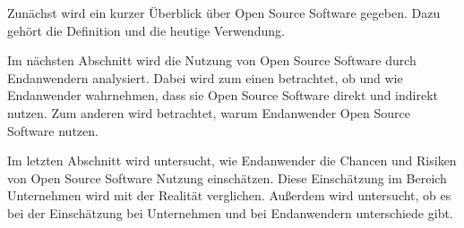 \documentclass[a4paper]{article}
\begin{document}
	   Zunächst wird ein kurzer Überblick über Open Source Software gegeben. Dazu gehört die Definition und die heutige Verwendung.
	   
	   
	   Im nächsten Abschnitt wird die Nutzung von Open Source Software durch Endanwendern analysiert. Dabei wird zum einen betrachtet, ob und wie Endanwender wahrnehmen, dass sie Open Source Software direkt und indirekt nutzen.
	   Zum anderen wird betrachtet, warum Endanwender Open Source Software nutzen.
	   
	   Im letzten Abschnitt wird untersucht, wie Endanwender die Chancen und Risiken von Open Source Software Nutzung einschätzen.
	   Diese Einschätzung im Bereich Unternehmen wird mit der Realität verglichen.
	   Außerdem wird untersucht, ob es bei der Einschätzung bei Unternehmen und bei Endanwendern unterschiede gibt. %
	
        
    \clearpage
    \nocite{*}
    \printbibliography
\end{document}
